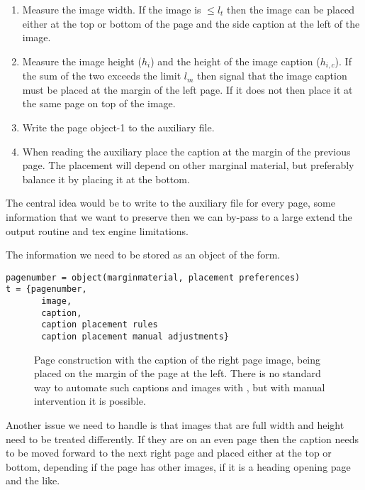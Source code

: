 \begin{enumerate}
\item Measure the image width. If the image is $\le l_t$ then the image can be placed either at the top
         or bottom of the page and the side caption at the left of the image.
\item Measure the image height ($h_i$) and the height of the image caption ($h_{i,c}$). If the sum of the two exceeds the limit $l_m$ then signal that the image caption must be placed at the margin of the left page. If it does not then place it at the same page on top of the image.

\item Write the page object-1 to the auxiliary file.

\item When reading the auxiliary place the caption at the margin of the previous page. The placement will
depend on other marginal material, but preferably balance it by placing it at the bottom. 
\end{enumerate}
  
The central idea would be to write to the auxiliary file for every page, some information that we want to preserve
then we can by-pass to a large extend the output routine and tex engine limitations.

The information we need to be stored as an object of the form.

\begin{verbatim}
pagenumber = object(marginmaterial, placement preferences)
t = {pagenumber,
       image,
       caption,
       caption placement rules
       caption placement manual adjustments}
\end{verbatim}
 
\begin{figure}[tbp]
\caption{Page construction with the caption of the right page image, being placed on the margin of the page at the left. There is no standard way to automate such captions and images with \latexe, but with manual
intervention it is possible.}
\label{unequal}
\end{figure}

Another issue we need to handle is that images that are full width and height need to be treated differently. If they are on an even page then the caption needs to be moved forward to the next right page and placed either at the top or bottom, depending if the page has other images, if it is a heading opening page and the like.


